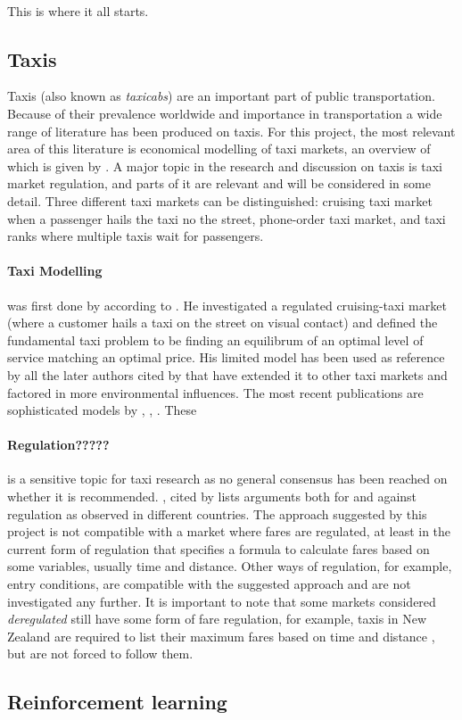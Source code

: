 \paragraph{}
This is where it all starts.

\subsection{Taxis}
Taxis (also known as \textit{taxicabs}) are an important part of public transportation. Because of their prevalence worldwide and importance in transportation a wide range of literature has been produced on taxis. For this project, the most relevant area of this literature is economical modelling of taxi markets, an overview of which is given by \textcite{Salanova2011taxi+review}. A major topic in the research and discussion on taxis is taxi market regulation, and parts of it are relevant and will be considered in some detail. Three different taxi markets can be distinguished: cruising taxi market when a passenger hails the taxi no the street, phone-order taxi market, and taxi ranks where multiple taxis wait for passengers.
\paragraph{Taxi Modelling} was first done by \textcite{Douglas1972taxi+regulation} according to \textcite{Salanova2011taxi+review}.  He investigated a regulated cruising-taxi market (where a customer hails a taxi on the street on visual contact) and defined the fundamental taxi problem to be finding an equilibrum of an optimal level of service matching an optimal price. His limited model has been used as reference by all the later authors cited by \textcite{Salanova2011taxi+review} that have extended it to other taxi markets and factored in more environmental influences. 
The most recent publications are sophisticated models by \textcite{Wong2008taxi+modeling}, \textcite{Yang2010taxi+equilibria}, \textcite{Yang2010taxi+nonlinear}. These 
\paragraph{Regulation?????} is a sensitive topic for taxi research as no general consensus has been reached on whether it is recommended. \textcite{Oecd2007taxi+policy}, cited by \parencite{Salanova2011taxi+review} lists arguments both for and against regulation as observed in different countries. The approach suggested by this project is not compatible with a market where fares are regulated, at least in the current form of regulation that specifies a formula to calculate fares based on some variables, usually time and distance. Other ways of regulation, for example, entry conditions, are compatible with the suggested approach and are not investigated any further. It is important to note that some markets considered \textit{deregulated} still have some form of fare regulation, for example, taxis in New Zealand are required to list their maximum fares based on time and distance \parencite{Gaunt1995taxi+newzealand}, but are not forced to follow them.

\subsection{Reinforcement learning}